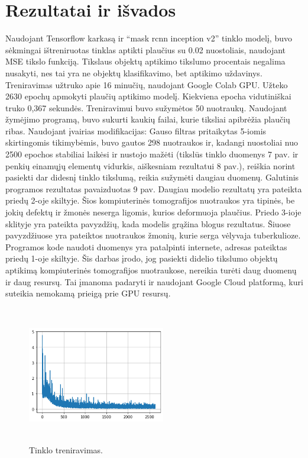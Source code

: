 \documentclass{VUMIFInfKursinis}
\begin{document}
\section{Rezultatai ir išvados}
\par
Naudojant Tensorflow karkasą ir \enquote{mask rcnn inception v2} tinklo modelį, buvo sėkmingai
ištreniruotas tinklas aptikti plaučius su 0.02 nuostoliais, naudojant MSE tikslo funkciją.
Tikslaus objektų aptikimo tikslumo procentais negalima nusakyti, nes tai yra ne objektų klasifikavimo,
bet aptikimo uždavinys.
Treniravimas užtruko apie 16 minučių,
naudojant Google Colab GPU. Užteko 2630 epochų apmokyti plaučių aptikimo modelį. Kiekviena epocha vidutiniškai truko 0,367 sekundės.
Treniravimui buvo sužymėtos 50 nuotraukų. Naudojant žymėjimo programą, buvo sukurti kaukių
failai, kurie tiksliai apibrėžia plaučių ribas. Naudojant įvairias modifikacijas:
Gauso filtras pritaikytas 5-iomis skirtingomis tikimybėmis, buvo gautos 298 nuotraukos ir, 
kadangi nuostoliai nuo 2500 epochos stabiliai laikėsi ir nustojo mažėti (tikslūs tinklo duomenys 7 pav. ir penkių einamųjų elementų vidurkis, aiškesniam rezultatui 8 pav.), reiškia norint
pasiekti dar didesnį tinklo tikslumą, reikia sužymėti daugiau duomenų.
Galutinis programos rezultatas pavaizduotas 9 pav. Daugiau modelio rezultatų yra pateikta priedų 2-oje skiltyje. Šios kompiuterinės tomografijos nuotraukos yra tipinės, be jokių defektų ir žmonės neserga ligomis, kurios deformuoja plaučius. Priedo 3-ioje sklityje yra pateikta pavyzdžių, kada modelis grąžina blogus rezultatus. Šiuose pavyzdžiuose yra pateiktos nuotraukos žmonių, kurie serga vėlyvaja tuberkulioze. Programos kode naudoti
duomenys yra patalpinti internete, adresas pateiktas priedų 1-oje skiltyje.
Šis darbas įrodo, jog pasiekti didelio tikslumo
objektų aptikimą kompiuterinės tomografijos nuotraukose, nereikia turėti daug duomenų ir daug
resursų. Tai įmanoma padaryti ir naudojant Google Cloud platformą, kuri suteikia
nemokamą prieigą prie GPU resursų.

\begin{figure}[ht]
  \centering
  \includegraphics[width=6cm,height=6cm,keepaspectratio]{neislygintas.png}
  \caption{Tinklo treniravimas.}
  \label{fig:kaukė1}
\end{figure}
\end{document}
